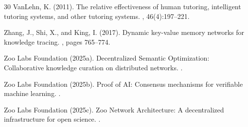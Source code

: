\documentclass[11pt,a4paper]{article}
\begin{document}
\begin{thebibliography}{30}
VanLehn, K. (2011).
\newblock The relative effectiveness of human tutoring, intelligent tutoring systems, and other tutoring systems.
, 46(4):197--221.

Zhang, J., Shi, X., and King, I. (2017).
\newblock Dynamic key-value memory networks for knowledge tracing.
, pages 765--774.

Zoo Labs Foundation (2025a).
\newblock Decentralized Semantic Optimization: Collaborative knowledge curation on distributed networks.
.

Zoo Labs Foundation (2025b).
\newblock Proof of AI: Consensus mechanisms for verifiable machine learning.
.

Zoo Labs Foundation (2025c).
\newblock Zoo Network Architecture: A decentralized infrastructure for open science.
.

\end{thebibliography}
\end{document}
